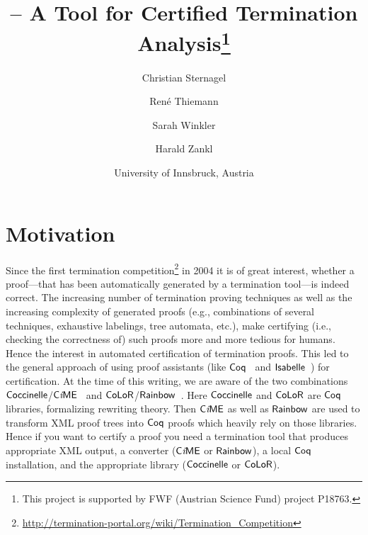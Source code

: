 \documentclass[a4paper,final]{easychair}
\author{Christian Sternagel \and René Thiemann \and
 Sarah Winkler \and Harald Zankl \and
 \centerline{University of Innsbruck, Austria}
}
\title{\CeTA{} -- A Tool for Certified Termination Analysis\thanks{This project is supported by FWF (Austrian Science Fund) project P18763.}}
\theoremstyle{definition}
\newcommand\formatID[1]{\ensuremath{{\sf#1}}}
\newcommand\CiME{\formatID{C\textit{i}ME}}
\newcommand\Coccinelle{\formatID{Coccinelle}}
\newcommand\CoLoR{\formatID{CoLoR}}
\newcommand\Coq{\formatID{Coq}}
\newcommand\Isabelle{\formatID{Isabelle}}
\newcommand\Rainbow{\formatID{Rainbow}}
\begin{document}
\maketitle

\section{Motivation}
Since the first termination competition\footnote{\url{http://termination-portal.org/wiki/Termination_Competition}}
in 2004 it is of great interest, whether
a proof---that has been automatically generated by a termination tool---is
indeed correct. The increasing number of termination proving techniques as well
as the increasing complexity of generated proofs (e.g., combinations of several
techniques, exhaustive labelings, tree automata, etc.), make certifying (i.e.,
checking the correctness of) such proofs more and more tedious for humans.
Hence the interest in automated certification of termination proofs. This led to
the general approach of using proof assistants (like \Coq{}~\cite{Coq} and
\Isabelle{}~\cite{Isabelle}) for certification. At the time of this writing, we
are aware of the two combinations \Coccinelle/\CiME{}~\cite{A3Pat,A3PatGraph}
and \CoLoR/\Rainbow{}~\cite{Color}. Here \Coccinelle{} and \CoLoR{} are \Coq{}
libraries, formalizing rewriting theory. Then \CiME{} as well as \Rainbow{} are
used to transform XML proof trees into \Coq{} proofs which heavily rely on those
libraries. Hence if you want to certify a proof you need a termination tool that
produces appropriate XML output, a converter (\CiME{} or \Rainbow{}), a local
\Coq{} installation, and the appropriate library (\Coccinelle{} or \CoLoR{}).
\end{document}
